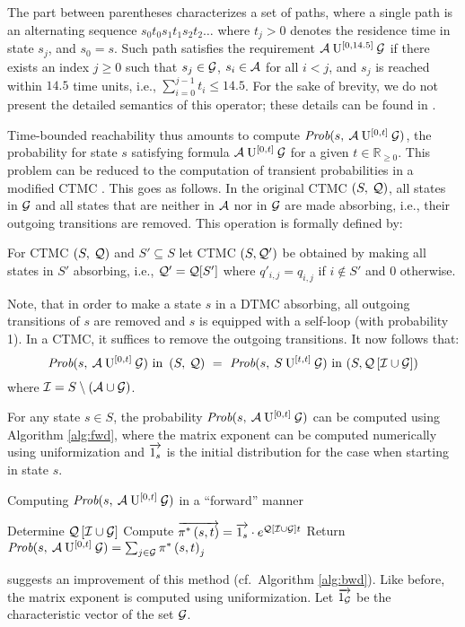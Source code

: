 \documentclass{entcs}
\begin{document}
		The part between parentheses characterizes a set of paths, where a single path is an alternating sequence $s_{0}t_{0}s_{1}t_{1}s_{2}t_{2}\ldots$ where $t_{j} > 0$ denotes the residence time in state $s_{j}$, and $s_{0} = s$.  Such path satisfies the requirement $\mathcal{A} \: \mathrm{U}^{[0,14.5]} \: \mathcal{G}$ if there exists an index $j \geq 0$ such that $s_{j} \in \mathcal{G}$, $s_i \in \mathcal{A}$ for all $i < j$, and $s_{j}$ is reached within $14.5$ time units, i.e., $\sum_{i=0}^{j{-}1}t_{i} \leq 14.5$.  For the sake of brevity, we do not present the detailed semantics of this operator; these details can be found in \cite{AzizSSB_ACMTCL00,BaierHHK_TSE03}.
	
		Time-bounded reachability thus amounts to compute $\mbox{\it Prob}(s, \: \mathcal{A} \: \mathrm{U}^{[0,t]} \: \mathcal{G} )$, the probability for state $s$ satisfying formula $\mathcal{A} \: \mathrm{U}^{[0,t]} \: \mathcal{G}$ for a given $t \in \mathbb{R}_{\geq 0}$.  This problem can be reduced to the computation of transient probabilities in a modified CTMC \cite{BaierHHK_TSE03}.  This goes as follows.  In the original CTMC $\left( S,\: \mathcal{Q} \right)$, all states in $\mathcal{G}$ and all states that are neither in $\mathcal{A}$ nor in $\mathcal{G}$ are made absorbing, i.e., their outgoing transitions are removed.   This operation is formally defined by:		
		\begin{definition}
		For CTMC $\left( S,\: \mathcal{Q} \right)$ and $S' \subseteq S$ let CTMC $(S, \mathcal{Q}')$  be obtained by making all states in $S'$ absorbing, i.e., $\mathcal{Q}' = \mathcal{Q}[S']$ where $q'_{i,j} = q_{i,j}$ if $i \not\in S'$ and 0 otherwise.
		\end{definition}
		Note, that in order to make a state $s$ in a DTMC absorbing, all outgoing transitions of $s$ are removed and $s$ is equipped with a self-loop (with probability 1).  In a CTMC, it suffices to remove the outgoing transitions.  It now follows that:
		{\small
		\[
			\PsaUg{s}{0}{t} \mbox{ in } \CTMC \ = \ \PsSUg{s}{t}{t} \mbox{ in } (S, \mQnavg)
		\]
		}
		where $\mathcal{I}=S \setminus \left( \mathcal{A} \cup \mathcal{G}\right)$.
		
		For any state $s \in S$, the probability $\mbox{\it Prob}(s, \: \mathcal{A} \: \mathrm{U}^{[0,t]} \: \mathcal{G} )$ can be computed using Algorithm \ref{alg:fwd}, where the matrix exponent can be computed numerically using uniformization and $\overrightarrow{1_{s} }$ is the initial distribution for the case when starting in state $s$.
		\begin{algorithm}
			\caption{Computing $\mbox{\it Prob}(s, \: \mathcal{A} \: \mathrm{U}^{[0,t]} \: \mathcal{G} )$ in a ``forward'' manner}
			\label{alg:fwd}
			\begin{algorithmic}[1]
				\STATE Determine $\mathcal{Q}\left[ \mathcal{I} \cup \mathcal{G} \right]$
				\STATE Compute $\overrightarrow{\pi^{*} \left(s, t \right)} = \overrightarrow{1_{s} } \cdot e^{\mathcal{Q}\left[ \mathcal{I} \cup \mathcal{G} \right] t}$
				\STATE Return $\mbox{\it Prob}(s, \: \mathcal{A} \: \mathrm{U}^{[0,t]} \: \mathcal{G} ) = \sum_{j \in \mathcal{G}}\pi^{*} \left(s, t \right)_{j}$
			\end{algorithmic}
		\end{algorithm}
		\cite{KatoenKNP_LNCS01} suggests an improvement of this method (cf.\ Algorithm \ref{alg:bwd}).  Like before, the matrix exponent is computed using uniformization.  Let $\overrightarrow{1_{\mathcal{G}}}$ be the characteristic vector of the set $\mathcal{G}$.
\end{document}
